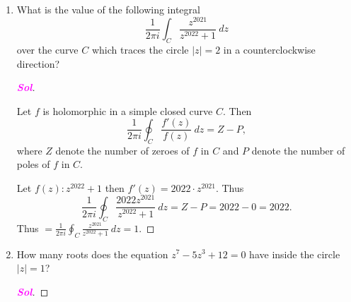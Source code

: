 \documentclass{article}
\theoremstyle{definition}
\newcommand{\abs}[1]{\left\lvert #1 \right\rvert}
\newcommand{\sol}{\textcolor{magenta}{\bf Sol}}
\begin{document}
\begin{enumerate}[\bf 1.]
\begin{proof}[\sol]
\begin{center}
			\end{center} By the Cauchy-Goursat Theorem, $$\oint_C\frac{e^z}{z-1}\ dz=0$$.
		\end{proof}
		\item What is the value of the following integral \[
		\frac{1}{2\pi i}\int_C\frac{z^{2021}}{z^{2022}+1}\ dz
		\] over the curve $C$ which traces the circle $\abs{z} = 2$ in a counterclockwise direction?
		\begin{proof}[\sol]
			\ \begin{tcolorbox}[colback=white,colframe=thmcolor,arc=5pt,title={\color{white}\bf Argument Principle}]
				Let $f$ is holomorphic in a simple closed curve $C$. Then \[
				\frac{1}{2\pi i}\oint_C\frac{f'(z)}{f(z)}\ dz=Z-P,
				\] where $Z$ denote the number of zeroes of $f$ in $C$ and $P$ denote the number of poles of $f$ in $C$.
			\end{tcolorbox}
			Let $f(z):z^{2022}+1$ then $f'(z)=2022\cdot z^{2021}$. Thus \[
			\frac{1}{2\pi i}\oint_C\frac{2022 z^{2021}}{z^{2022}+1}\ dz = Z-P=2022-0=2022.
			\] Thus $\displaystyle=\frac{1}{2\pi i}\oint_C\frac{z^{2021}}{z^{2022}+1}\ dz =1$.
		\end{proof}
		\item How many roots does the equation $z^7 - 5z^3 + 12 = 0$ have inside the circle $\abs{z} = 1$?
		\begin{proof}[\sol]
			

\end{proof}
\end{enumerate}
\end{document}
